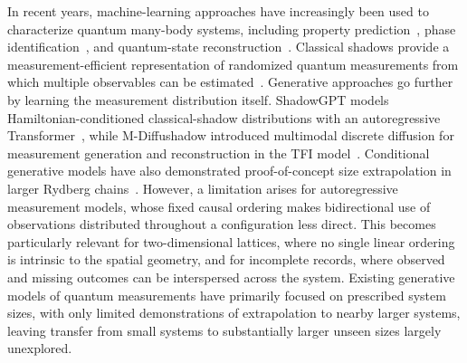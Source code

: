 \documentclass[pdflatex,sn-nature]{sn-jnl}%
\theoremstyle{thmstyleone}%
\theoremstyle{thmstyletwo}%
\theoremstyle{thmstylethree}%
\begin{document}
In recent years, machine-learning approaches have increasingly been used to characterize quantum many-body systems, including property prediction~\cite{schutt2017schnet,wanner2024predicting}, phase identification~\cite{carrasquilla2017machine,cho2024machine}, and quantum-state reconstruction~\cite{torlai2018neural,carrasquilla2019reconstructing}. Classical shadows provide a measurement-efficient representation of randomized quantum measurements from which multiple observables can be estimated~\cite{huang2020predicting}. Generative approaches go further by learning the measurement distribution itself. ShadowGPT models Hamiltonian-conditioned classical-shadow distributions with an autoregressive Transformer~\cite{yao2024shadowgpt}, while M-Diffushadow introduced multimodal discrete diffusion for measurement generation and reconstruction in the TFI model~\cite{li2026multimodal}. Conditional generative models have also demonstrated proof-of-concept size extrapolation in larger Rydberg chains~\cite{wang2022predicting}. However, a limitation arises for autoregressive measurement models, whose fixed causal ordering makes bidirectional use of observations distributed throughout a configuration less direct. This becomes particularly relevant for two-dimensional lattices, where no single linear ordering is intrinsic to the spatial geometry, and for incomplete records, where observed and missing outcomes can be interspersed across the system. Existing generative models of quantum measurements have primarily focused on prescribed system sizes, with only limited demonstrations of extrapolation to nearby larger systems, leaving transfer from small systems to substantially larger unseen sizes largely unexplored.
\end{document}
